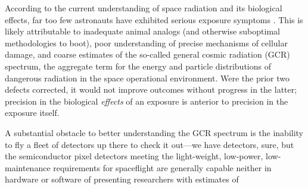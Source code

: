 \documentclass[12pt]{article}
\begin{document}
According to the current understanding of space radiation and its biological effects,
far too few astronauts have exhibited serious exposure symptoms \cite{dummies}.
This is likely attributable to inadequate animal analogs (and otherwise suboptimal methodologies to boot), %
poor understanding of precise mechanisms of cellular damage, and coarse estimates of the so-called general cosmic radiation (GCR) spectrum,
the aggregate term for the energy and particle distributions of dangerous radiation in the space operational environment.
Were the prior two defects corrected, it would not improve outcomes without progress in the latter;
precision in the biological \textit{effects} of an exposure is anterior to precision in the exposure itself.

A substantial obstacle to better understanding the GCR spectrum is the inability to fly a fleet of detectors up there to check it out---we have detectors,
sure, but the semiconductor pixel detectors meeting the light-weight, low-power, low-maintenance requirements for spaceflight are generally capable
neither in hardware or software of presenting researchers with estimates of

\end{document}
